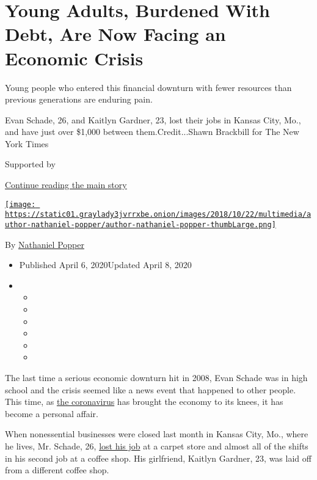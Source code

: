 \hypertarget{young-adults-burdened-with-debt-are-now-facing-an-economic-crisis}{%
\section{Young Adults, Burdened With Debt, Are Now Facing an Economic
Crisis}\label{young-adults-burdened-with-debt-are-now-facing-an-economic-crisis}}

Young people who entered this financial downturn with fewer resources
than previous generations are enduring pain.

Evan Schade, 26, and Kaitlyn Gardner, 23, lost their jobs in Kansas
City, Mo., and have just over \$1,000 between them.Credit...Shawn
Brackbill for The New York Times

Supported by

\protect\hyperlink{after-sponsor}{Continue reading the main story}

\href{https://www.nytimes3xbfgragh.onion/by/nathaniel-popper}{\texttt{[image: https://static01.graylady3jvrrxbe.onion/images/2018/10/22/multimedia/author-nathaniel-popper/author-nathaniel-popper-thumbLarge.png]}}

By
\href{https://www.nytimes3xbfgragh.onion/by/nathaniel-popper}{Nathaniel
Popper}

\begin{itemize}
\item
  Published April 6, 2020Updated April 8, 2020
\item
  \begin{itemize}
  \item
  \item
  \item
  \item
  \item
  \item
  \end{itemize}
\end{itemize}

The last time a serious economic downturn hit in 2008, Evan Schade was
in high school and the crisis seemed like a news event that happened to
other people. This time, as
\href{https://www.nytimes3xbfgragh.onion/news-event/coronavirus?action=click\&pgtype=Article\&state=default\&module=styln-coronavirus\&variant=show\&region=TOP_BANNER\&context=storyline_menu}{the
coronavirus} has brought the economy to its knees, it has become a
personal affair.

When nonessential businesses were closed last month in Kansas City, Mo.,
where he lives, Mr. Schade, 26,
\href{https://www.nytimes3xbfgragh.onion/2020/04/02/business/economy/coronavirus-unemployment-claims.html?action=click\&module=RelatedLinks\&pgtype=Article}{lost
his job} at a carpet store and almost all of the shifts in his second
job at a coffee shop. His girlfriend, Kaitlyn Gardner, 23, was laid off
from a different coffee shop.

